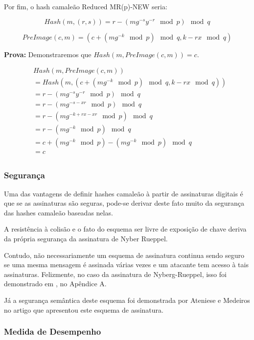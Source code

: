 \documentclass[a4paper]{article}
\begin{document}
Por fim, o hash camaleão Reduced MR(p)-NEW seria:

$$
Hash(m, (r, s)) = r-(mg^{-s}y^{-r} \mod p) \mod q
$$

$$
PreImage(c, m) = (c+(mg^{-k} \mod p) \mod q, k-rx \mod q)
$$

\textbf{Prova: }Demonstraremos que $Hash(m, PreImage(c, m)) = c$.

\begin{equation*}
  \begin{split}
    &Hash(m, PreImage(c, m))\\
    &= Hash(m, (c+(mg^{-k} \mod p) \mod q, k-rx \mod q))\\
    &= r-(mg^{-s}y^{-r} \mod p) \mod q\\
    &= r-(mg^{-s-xr} \mod p) \mod q\\
    &= r-(mg^{-k+rx-xr} \mod p) \mod q\\
    &= r-(mg^{-k} \mod p) \mod q\\
    &= c+(mg^{-k} \mod p)-(mg^{-k} \mod p) \mod q\\
    &= c\\
  \end{split}
\end{equation*}

\subsubsection{Segurança}

Uma das vantagens de definir hashes camaleão à partir de assinaturas
digitais é que se as assinaturas são seguras, pode-se derivar deste
fato muito da segurança das hashes camaleão baseadas nelas.

A resistência à colisão e o fato do esquema ser livre de exposição de
chave deriva da própria segurança da assinatura de Nyber Rueppel.

Contudo, não necessariamente um esquema de assinatura continua sendo
seguro se uma mesma mensagem é assinada várias vezes e um atacante tem
acesso à tais assinaturas. Felizmente, no caso da assinatura de
Nyberg-Rueppel, isso foi demonstrado em \cite{twin}, no Apêndice A.

Já a segurança semântica deste esquema foi demonstrada por Ateniese e
Medeiros no artigo que apresentou este esquema de assinatura.

\subsubsection{Medida de Desempenho}
\end{document}
